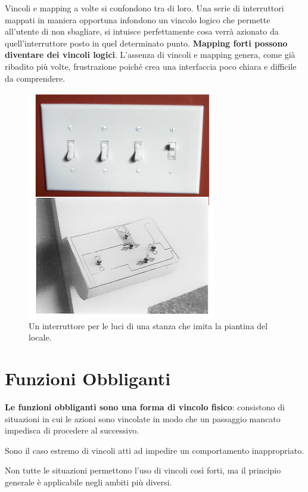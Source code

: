 Vincoli e mapping a volte si confondono tra di loro. Una serie di interruttori mappati in maniera opportuna infondono un vincolo logico che permette all'utente di non sbagliare, si intuisce perfettamente cosa verrà azionato da quell'interruttore posto in quel determinato punto. \textbf{Mapping forti possono diventare dei vincoli logici}.
L'assenza di vincoli e mapping genera, come già ribadito più volte, frustrazione poiché crea una interfaccia poco chiara e difficile da comprendere.
\begin{figure}[!h]
	\centering
	\includegraphics[scale=0.67]{immagini/Interruttori}
	\caption{Un interruttore per le luci di una stanza che imita la piantina del locale.}
\end{figure}

\pagebreak

\section{Funzioni Obbliganti}
\textbf{Le funzioni obbliganti sono una forma di vincolo fisico}: consistono di situazioni in cui le azioni sono vincolate in modo che un passaggio mancato impedisca di procedere al successivo.

Sono il caso estremo di vincoli atti ad impedire un comportamento inappropriato.

Non tutte le situazioni permettono l'uso di vincoli così forti, ma il principio generale è applicabile negli ambiti più diversi.

